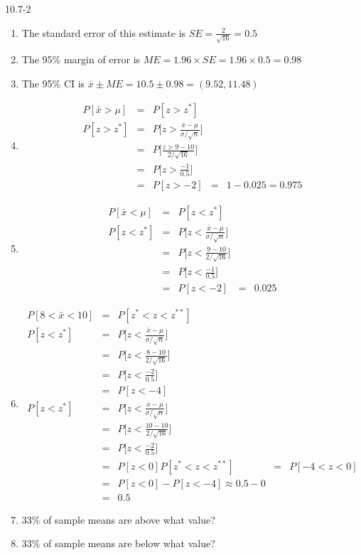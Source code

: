 \begin{exsol@solution}{10.7-2}
\begin{enumerate}
  \item The standard error of this estimate is $SE = \frac{2}{\sqrt{16}} = 0.5$
  \item The 95\% margin of error is $ME = 1.96 \times SE = 1.96 \times 0.5 = 0.98$
  \item The 95\% CI is $\bar{x} \pm ME = 10.5 \pm 0.98 = (9.52, 11.48) $
  \item
  \begin{eqnarray*}
      P[ \bar{x} > \mu ] &=& P[z > z^*] \\
       P[z > z^*] &=& P\Big[ z > \frac{ \bar{x}-\mu}{ \sigma/\sqrt{n}} \Big] \\
       &=& P\Big[ \frac{z > 9 - 10}{ 2/\sqrt{16}} \Big] \\
       &=& P\Big[ z > \frac{-1}{0.5} \Big]   \\
        &=& P[z > -2]
        &=& 1 - 0.025 = 0.975
  \end{eqnarray*}

  \item
  \begin{eqnarray*}
      P[ \bar{x} < \mu ] &=& P[z < z^*] \\
       P[z < z^*] &=& P\Big[ z < \frac{ \bar{x}-\mu}{ \sigma/\sqrt{n}} \Big] \\
       &=& P\Big[ z < \frac{ 9 - 10}{ 2/\sqrt{16}} \Big] \\
       &=& P\Big[ z < \frac{-1}{0.5} \Big]   \\
        &=& P[z < -2]
        &=&  0.025
  \end{eqnarray*}

  \item
  \begin{eqnarray*}
      P[ 8 < \bar{x} < 10 ] &=& P[ z^* < z < z^{**} ] \\
       P[z < z^*] &=& P\Big[ z < \frac{ \bar{x}-\mu}{ \sigma/\sqrt{n}} \Big] \\
       &=& P\Big[ z < \frac{ 8 - 10}{ 2/\sqrt{16}} \Big] \\
       &=& P\Big[ z < \frac{-2}{0.5} \Big]   \\
        &=& P[z < -4] \\
        P[z < z^*] &=& P\Big[ z < \frac{ \bar{x}-\mu}{ \sigma/\sqrt{n}} \Big] \\
       &=& P\Big[ z < \frac{ 10 - 10}{ 2/\sqrt{16}} \Big] \\
       &=& P\Big[ z < \frac{-2}{0.5} \Big]   \\
        &=& P[z < 0]
      P[ z^* < z < z^{**} ] &=& P[ -4 < z < 0] \\
        &=&  P[ z < 0 ] - P[z < -4] \approx 0.5 - 0 \\
        &=& 0.5
  \end{eqnarray*}



  \item 33\% of sample means are above what value?
  \item 33\% of sample means are below what value?
\end{enumerate}
\end{exsol@solution}
